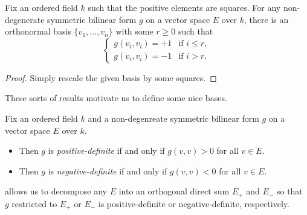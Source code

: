 \documentclass[../notes.tex]{subfiles}
\begin{document}
\begin{corollary}
	Fix an ordered field $k$ such that the positive elements are squares. For any non-degen\-erate symmetric bilinear form $g$ on a vector space $E$ over $k$, there is an orthonormal basis $\{v_1,\ldots,v_n\}$ with some $r\ge0$ such that
	\[\begin{cases}
		g(v_i,v_i)=+1 & \text{if }i\le r, \\
		g(v_i,v_i)=-1 & \text{if }i>r.
	\end{cases}\]
\end{corollary}
\begin{proof}
	Simply rescale the given basis by some squares.
\end{proof}
These sorts of results motivate us to define some nice bases.
\begin{definition}
	Fix an ordered field $k$ and a non-degenreate symmetric bilinear form $g$ on a vector space $E$ over $k$.
	\begin{itemize}
		\item Then $g$ is \textit{positive-definite} if and only if $g(v,v)>0$ for all $v\in E$.
		\item Then $g$ is \textit{negative-definite} if and only if $g(v,v)<0$ for all $v\in E$.
	\end{itemize}
\end{definition}
\begin{remark}
	 allows us to decompose any $E$ into an orthogonal direct sum $E_+$ and $E_-$ so that $g$ restricted to $E_+$ or $E_-$ is positive-definite or negative-definite, respectively.
\end{remark}
\end{document}
